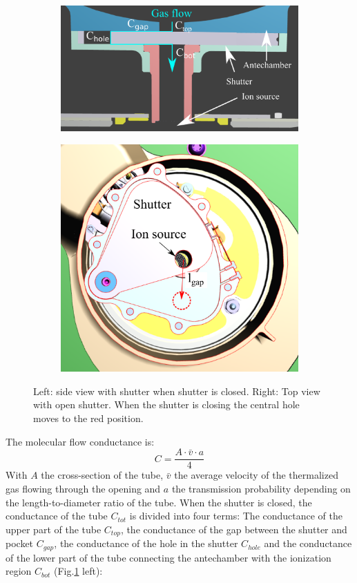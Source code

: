 		\begin{figure}[h!]
			\begin{subfigure}{0.5\textwidth}
				\centering
				\includegraphics[width=\textwidth]{Bilder/Shutter_sideview.png}
			\end{subfigure}
			\begin{subfigure}{0.5\textwidth}
				\centering
				\includegraphics[width=.8\textwidth]{Bilder/Shutter_topview.png}
			\end{subfigure}
		\caption{Left: side view with shutter when shutter is closed. Right: Top view with open shutter. When the shutter is closing the central hole moves to the red position.}
		\label{fig:shutterMotor}
		\end{figure}
		The molecular flow conductance is:
		\begin{equation}
			C = \frac{A\cdot\bar{v}\cdot a}{4}
		\end{equation}
		With $A$ the cross-section of the tube, $\bar{v}$ the average velocity of the thermalized gas flowing through the opening and $a$ the transmission probability depending on the length-to-diameter ratio of the tube. When the shutter is closed, the conductance of the tube $C_{tot}$ is divided into four terms: The conductance of the upper part of the tube $C_{top}$, the conductance of the gap between the shutter and pocket $C_{gap}$, the conductance of the hole in the shutter $C_{hole}$ and the conductance of the lower part of the tube connecting the antechamber with the ionization region $C_{bot}$ (Fig.\ref{fig:shutterMotor} left):
